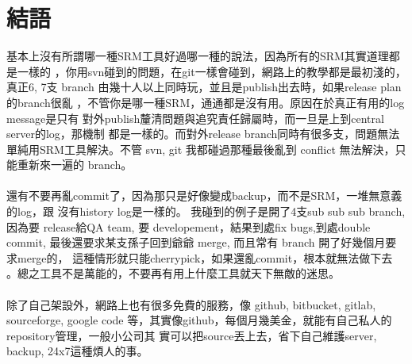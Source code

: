   \section{結語}
  基本上沒有所謂哪一種SRM工具好過哪一種的說法，因為所有的SRM其實道理都是一樣的
  ，你用svn碰到的問題，在git一樣會碰到，網路上的教學都是最初淺的，真正6, 7支
  branch 由幾十人以上同時玩，並且是publish出去時，如果release plan的branch很亂
  ，不管你是哪一種SRM，通通都是沒有用。原因在於真正有用的log message是只有
  對外publish釐清問題與追究責任歸屬時，而一旦是上到central server的log，那機制
  都是一樣的。而對外release branch同時有很多支，問題無法單純用SRM工具解決。不管
  svn, git 我都碰過那種最後亂到 conflict 無法解決，只能重新來一遍的 branch。
  \\\\
  還有不要再亂commit了，因為那只是好像變成backup，而不是SRM，一堆無意義的log，跟
  沒有history log是一樣的。 我碰到的例子是開了4支sub sub sub branch, 因為要
  release給QA team, 要 developement，結果到處fix bugs,到處double commit, 
  最後還要求某支孫子回到爺爺 merge, 而且常有 branch 開了好幾個月要求merge的，
  這種情形就只能cherrypick，如果還亂commit，根本就無法做下去
  。總之工具不是萬能的，不要再有用上什麼工具就天下無敵的迷思。
  \\\\
  除了自己架設外，網路上也有很多免費的服務，像 github, bitbucket, gitlab,
  sourceforge, google code
  等，其實像github，每個月幾美金，就能有自己私人的repository管理，一般小公司其
  實可以把source丟上去，省下自己維護server, backup, 24x7這種煩人的事。

